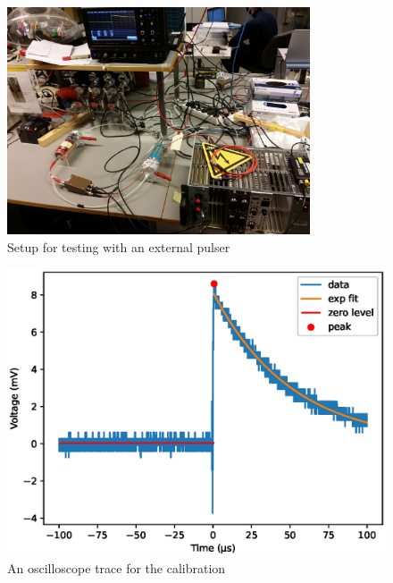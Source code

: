 \documentclass[a4paper]{article}
\begin{document}
\begin{figure}[ht!]
\centering
\includegraphics[width=0.8\textwidth]{fig/IMG_20201130_135000.jpg}
\caption{Setup for testing with an external pulser}
\label{fig:pulser_setup}
\end{figure}

\begin{figure}[ht!]
\centering
\includegraphics[width=\textwidth]{fig/python/calibration_trace.eps}
\caption{An oscilloscope trace for the calibration}
\label{fig:cal_trace}
\end{figure}



\clearpage
\end{document}
